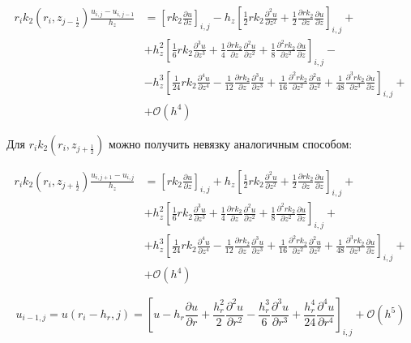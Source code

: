 \begin{align*}
  r_{i} k_2(r_i, z_{j-\frac{1}{2}}) \frac{u_{i, j} - u_{i, j - 1}}{h_z} &= 
  \left[ r k_2 \frac{\partial u}{\partial z} \right]_{i, j}
  - h_z \left[
  \frac{1}{2} r k_2 \frac{\partial^2 u}{\partial z^2}
  + \frac{1}{2} \frac{\partial r k_2}{\partial z} \frac{\partial u}{\partial z}
  \right]_{i, j} +\\
  &+ h^2_z \left[
    \frac{1}{6} r k_2 \frac{\partial^3 u}{\partial z^3}
    + \frac{1}{4} \frac{\partial r k_2}{\partial z} \frac{\partial^2 u}{\partial z^2}
    + \frac{1}{8} \frac{\partial^2 r k_2}{\partial z^2} \frac{\partial u}{\partial z}
  \right]_{i, j} -\\
  &- h^3_z \left[
   \frac{1}{24} r k_2 \frac{\partial^4 u}{\partial z^4} - \frac{1}{12} \frac{\partial r k_2}{\partial z} \frac{\partial^3 u}{\partial z^3}
  + \frac{1}{16} \frac{\partial^2 r k_2}{\partial z^2} \frac{\partial^2 u}{\partial z^2}
  + \frac{1}{48} \frac{\partial^3 r k_2}{\partial z^3} \frac{\partial u}{\partial z}
   \right]_{i, j} +\\
  &+ \mathcal{O}(h^4)
\end{align*}

Для 
$
  r_{i} k_2(r_i, z_{j+\frac{1}{2}})
$
можно получить невязку аналогичным способом:

\begin{align*}
  r_{i} k_2(r_i, z_{j+\frac{1}{2}}) \frac{u_{i, j + 1} - u_{i, j}}{h_z} &= 
  \left[ r k_2 \frac{\partial u}{\partial z} \right]_{i, j}
  + h_z \left[
  \frac{1}{2} r k_2 \frac{\partial^2 u}{\partial z^2}
  + \frac{1}{2} \frac{\partial r k_2}{\partial z} \frac{\partial u}{\partial z}
  \right]_{i, j} +\\
  &+ h^2_z \left[
    \frac{1}{6} r k_2 \frac{\partial^3 u}{\partial z^3}
    + \frac{1}{4} \frac{\partial r k_2}{\partial z} \frac{\partial^2 u}{\partial z^2}
    + \frac{1}{8} \frac{\partial^2 r k_2}{\partial z^2} \frac{\partial u}{\partial z}
  \right]_{i, j} +\\
  &+ h^3_z \left[
   \frac{1}{24} r k_2 \frac{\partial^4 u}{\partial z^4} - \frac{1}{12} \frac{\partial r k_2}{\partial z} \frac{\partial^3 u}{\partial z^3}
  + \frac{1}{16} \frac{\partial^2 r k_2}{\partial z^2} \frac{\partial^2 u}{\partial z^2}
  + \frac{1}{48} \frac{\partial^3 r k_2}{\partial z^3} \frac{\partial u}{\partial z}
   \right]_{i, j} +\\
  &+ \mathcal{O}(h^4)
\end{align*}

\[
  u_{i - 1, j} = u(r_i - h_r, j) = \left[
    u - h_r \frac{\partial u}{\partial r} + \frac{h^2_r}{2}\frac{\partial^2 u}{\partial r^2}
    - \frac{h^3_r}{6}\frac{\partial^3 u}{\partial r^3} + \frac{h^4_r}{24}\frac{\partial^4 u}{\partial r^4}
  \right]_{i,j}
  + \mathcal{O}(h^5)
\]

